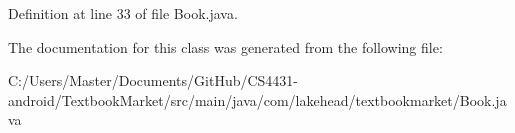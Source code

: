Definition at line 33 of file Book.\-java.



The documentation for this class was generated from the following file\-:\begin{DoxyCompactItemize}
\item 
C\-:/\-Users/\-Master/\-Documents/\-Git\-Hub/\-C\-S4431-\/android/\-Textbook\-Market/src/main/java/com/lakehead/textbookmarket/Book.\-java\end{DoxyCompactItemize}
